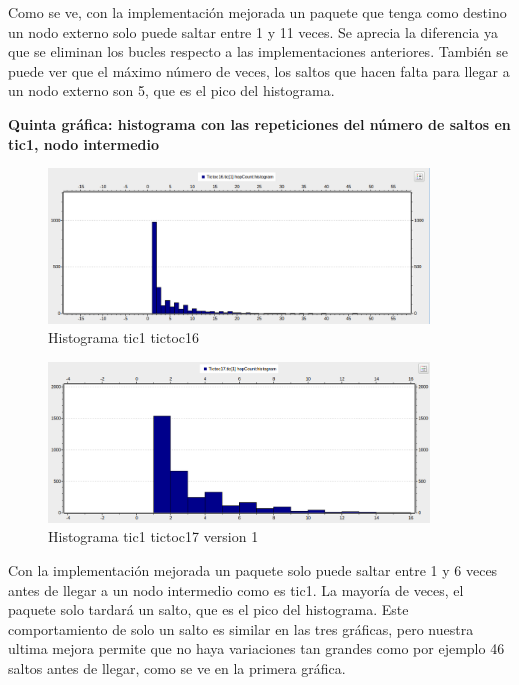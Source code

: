 \documentclass{article}
\begin{document}
			
		Como se ve, con la implementación mejorada un paquete  que tenga como destino un nodo externo solo puede saltar entre 1 y 11 veces. Se aprecia la diferencia ya que se eliminan los bucles respecto a las implementaciones anteriores. 
		También se  puede ver que el máximo número de veces, los saltos que hacen falta para llegar a un nodo externo son 5, que es el pico del histograma.
		
		\newpage
		
		\textbf{Quinta gráfica: histograma con las repeticiones del número de saltos en tic1, nodo intermedio}\\
		
		\begin{figure}[htb]
			\centering
			\includegraphics[width=0.9\textwidth]{tictoc16/figura5.png}
			\caption{Histograma tic1 tictoc16}
			\end {figure}
			
		\begin{figure}[htb]
			\centering
			\includegraphics[width=0.9\textwidth]{tictoc17v1/figura5.png}
			\caption{Histograma tic1 tictoc17 version 1}
			\end {figure}
			
		\newpage
			

		
		Con la implementación mejorada un paquete solo puede  saltar entre 1 y 6 veces antes de llegar a un nodo intermedio como es tic1. La mayoría de veces, el paquete solo tardará un salto, que es el pico del histograma. Este comportamiento de solo un salto es similar en las tres gráficas, pero nuestra ultima mejora permite que no haya variaciones tan grandes como por ejemplo 46 saltos antes de llegar, como se ve en la primera gráfica.
\end{document}
